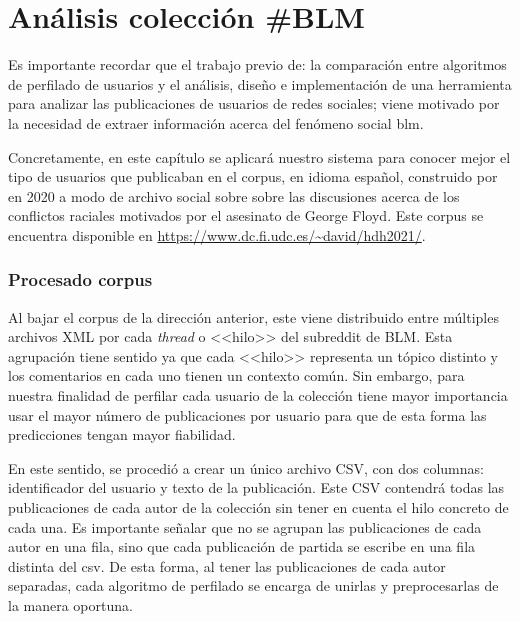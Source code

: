 \chapter{Análisis colección \#BLM}
\label{chap:blm}
Es importante recordar que el trabajo previo de: la comparación entre algoritmos de perfilado de usuarios y el análisis, diseño e implementación de una herramienta para analizar las publicaciones de usuarios de redes sociales; viene motivado por la necesidad de extraer información acerca del fenómeno social \acrfull{blm}.

Concretamente, en este capítulo se aplicará nuestro sistema para conocer mejor el tipo de usuarios que publicaban en el corpus, en idioma español, construido por \cite{heritage_BLM} en 2020 a modo de archivo social sobre sobre las discusiones acerca de los conflictos raciales motivados por el asesinato de George Floyd. Este corpus se encuentra disponible en \url{https://www.dc.fi.udc.es/~david/hdh2021/}.
\subsection{Procesado corpus}
Al bajar el corpus de la dirección anterior, este viene distribuido entre múltiples archivos XML por cada \textit{thread} o <<hilo>> del subreddit de BLM. Esta agrupación tiene sentido ya que cada <<hilo>> representa un tópico distinto y los comentarios en cada uno tienen un contexto común. Sin embargo, para nuestra finalidad de perfilar cada usuario de la colección tiene mayor importancia usar el mayor número de publicaciones por usuario para que de esta forma las predicciones tengan mayor fiabilidad.


En este sentido, se procedió a crear un único archivo CSV, con dos columnas: identificador del usuario y texto de la publicación. Este CSV contendrá todas las publicaciones de cada autor de la colección sin tener en cuenta el hilo concreto de cada una. Es importante señalar que no se agrupan las publicaciones de cada autor en una fila, sino que cada publicación de partida se escribe en una fila distinta del csv. De esta forma, al tener las publicaciones de cada autor separadas, cada algoritmo de perfilado se encarga de unirlas y preprocesarlas de la manera oportuna.

